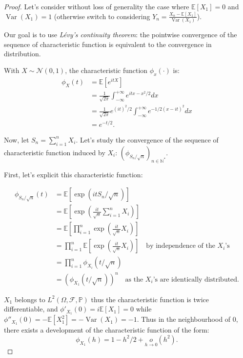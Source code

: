 \begin{proof}
    Let's consider without loss of generality the case where $\mathbb{E}[X_1]=0$ and $\operatorname{Var}(X_1) = 1$ (otherwise switch to considering $Y_n = \frac{X_n - \mathbb{E}[X_1]}{\operatorname{Var}(X_1)}$).

    Our goal is to use \textit{L\'evy's continuity theorem}: the pointwise convergence of the sequence of characteristic function is equivalent to the convergence in distribution.

    With $X\sim \mathcal{N}(0,1)$, the characteristic function $\phi_x(\cdot)$ is:
    \begin{align*}
        \phi_X(t) &= \mathbb{E}[e^{itX}]\\
        &= \frac1{\sqrt{2\pi}} \int_{-\infty}^{+\infty} e^{itx - x^2/2} dx\\
        &= \frac1{\sqrt{2\pi}}e^{(it)^2/2} \int_{-\infty}^{+\infty} e^{-1/2(x - it)^2} dx\\
        &= e^{-t/2}.
    \end{align*}

    Now, let $S_n = \sum_{i=1}^{n} X_i$. Let's study the convergence of the sequence of characteristic function induced by $X_i$: $\left(\phi_{S_n/\sqrt{n}}\right)_{n\in \mathbb{N}^{*}}$.

    First, let's explicit this characteristic function:
    
    \begin{align*}
        \phi_{S_n/\sqrt{n}}(t) &= \mathbb{E}[\exp(it S_n/\sqrt{n})]\\
        &= \mathbb{E}\left[\exp(\frac{it}{\sqrt{n}} \sum_{i=1}^{n} X_i)\right]\\
        &= \mathbb{E}\left[\prod_{i=1}^{n} \exp(\frac{it}{\sqrt{n}} X_i)\right]\\
        &= \prod_{i=1}^{n} \mathbb{E}\left[\exp(\frac{it}{\sqrt{n}} X_i)\right] \quad \text{by independence of the $X_i$'s}\\
        &= \prod_{i=1}^{n} \phi_{X_i}(t/ \sqrt{n})\\
        &= \left(\phi_{X_1}(t/ \sqrt{n})\right)^n \quad \text{as the $X_i$'s are identically distributed.}
    \end{align*}

    $X_1$ belongs to $L^2(\Omega, \mathcal{F}, \mathbb{P})$ thus the characteristic function is twice differentiable, and $\phi'_{X_1}(0) = i \mathbb{E}[X_1] = 0$ while $\phi''_{X_1}(0) = - \mathbb{E}[X_1^2] = -\operatorname{Var}(X_1) = -1$. Thus in the neighbourhood of $0$, there exists a development of the characteristic function of the form: \[\phi_{X_1}(h) = 1 - h^2/2 + \underset{h \to 0}{o} (h^2).\]


\end{proof}
